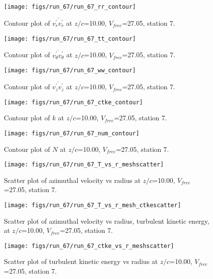 \begin{figure}[H]
\centering
\texttt{[image: figs/run\_67/run\_67\_rr\_contour]}
\caption{Contour plot of $\overline{v_{r}^{\prime} v_{r}^{\prime}}$ at $z/c$=10.00, $V_{free}$=27.05, station 7.}
\end{figure}


\begin{figure}[H]
\centering
\texttt{[image: figs/run\_67/run\_67\_tt\_contour]}
\caption{Contour plot of $\overline{v_{\theta}^{\prime} v_{\theta}^{\prime}}$ at $z/c$=10.00, $V_{free}$=27.05, station 7.}
\end{figure}


\begin{figure}[H]
\centering
\texttt{[image: figs/run\_67/run\_67\_ww\_contour]}
\caption{Contour plot of $\overline{v_{z}^{\prime} v_{z}^{\prime}}$ at $z/c$=10.00, $V_{free}$=27.05, station 7.}
\end{figure}


\begin{figure}[H]
\centering
\texttt{[image: figs/run\_67/run\_67\_ctke\_contour]}
\caption{Contour plot of $k$ at $z/c$=10.00, $V_{free}$=27.05, station 7.}
\end{figure}


\begin{figure}[H]
\centering
\texttt{[image: figs/run\_67/run\_67\_num\_contour]}
\caption{Contour plot of $N$ at $z/c$=10.00, $V_{free}$=27.05, station 7.}
\end{figure}


\begin{figure}[H]
\centering
\texttt{[image: figs/run\_67/run\_67\_T\_vs\_r\_meshscatter]}
\caption{Scatter plot of azimuthal velocity vs radius at $z/c$=10.00, $V_{free}$=27.05, station 7.}
\end{figure}


\begin{figure}[H]
\centering
\texttt{[image: figs/run\_67/run\_67\_T\_vs\_r\_mesh\_ctkescatter]}
\caption{Scatter plot of azimuthal velocity vs radius, turbulent kinetic energy, at $z/c$=10.00, $V_{free}$=27.05, station 7.}
\end{figure}


\begin{figure}[H]
\centering
\texttt{[image: figs/run\_67/run\_67\_ctke\_vs\_r\_meshscatter]}
\caption{Scatter plot of turbulent kinetic energy vs radius at $z/c$=10.00, $V_{free}$=27.05, station 7.}
\end{figure}


